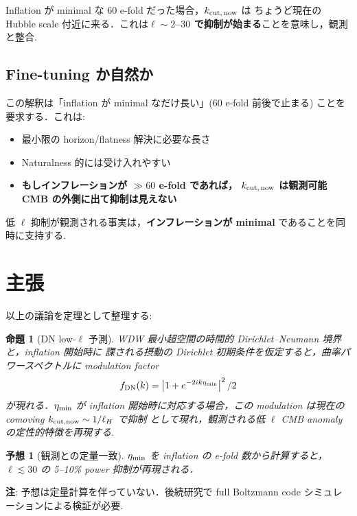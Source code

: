 \documentclass[11pt,a4paper]{article}
\newtheorem{proposition}{命題}
\newtheorem{conjecture}{予想}
\begin{document}
Inflation が minimal な 60 e-fold だった場合，$k_{\rm cut,\,now}$ は
ちょうど現在の Hubble scale 付近に来る．これは\textbf{$\ell \sim 2$--$30$
で抑制が始まる}ことを意味し，観測と整合.

\subsection{Fine-tuning か自然か}

この解釈は「inflation が minimal なだけ長い」(60 e-fold 前後で止まる)
ことを要求する．これは:
\begin{itemize}
\item 最小限の horizon/flatness 解決に必要な長さ
\item Naturalness 的には受け入れやすい
\item \textbf{もしインフレーションが $\gg 60$ e-fold であれば，
$k_{\rm cut,\,now}$ は観測可能 CMB の外側に出て抑制は見えない}
\end{itemize}

低 $\ell$ 抑制が観測される事実は，\textbf{インフレーションが minimal}
であることを同時に支持する.

\section{主張}

以上の議論を定理として整理する:

\begin{proposition}[DN low-$\ell$ 予測]
WDW 最小超空間の時間的 Dirichlet--Neumann 境界と，inflation 開始時に
課される摂動の Dirichlet 初期条件を仮定すると，曲率パワースペクトルに
modulation factor
\begin{equation}
f_{\rm DN}(k) = \left|1 + e^{-2ik\eta_{\rm min}}\right|^2 / 2
\end{equation}
が現れる．$\eta_{\rm min}$ が inflation 開始時に対応する場合，この
modulation は現在の comoving $k_{\rm cut,now} \sim 1/\ell_H$ で抑制
として現れ，観測される低 $\ell$ CMB anomaly の定性的特徴を再現する.
\end{proposition}

\begin{conjecture}[観測との定量一致]
$\eta_{\rm min}$ を inflation の e-fold 数から計算すると，
$\ell \lesssim 30$ の 5--10\% power 抑制が再現される．
\end{conjecture}

\textbf{注}: 予想は定量計算を伴っていない．後続研究で full Boltzmann
code シミュレーションによる検証が必要.
\end{document}
